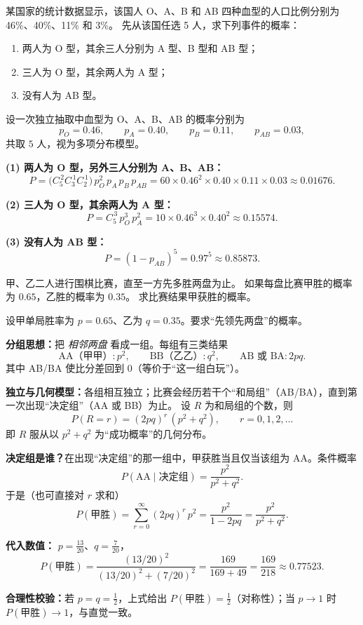 \begin{exercise}
某国家的统计数据显示，该国人 O、A、B 和 AB 四种血型的人口比例分别为 46\%、40\%、11\% 和 3\%。
先从该国任选 5 人，求下列事件的概率：
\begin{enumerate}
  \item 两人为 O 型，其余三人分别为 A 型、B 型和 AB 型；
  \item 三人为 O 型，其余两人为 A 型；
  \item 没有人为 AB 型。
\end{enumerate}
\end{exercise}
\begin{solution}
设一次独立抽取中血型为 O、A、B、AB 的概率分别为
\[
p_O=0.46,\qquad p_A=0.40,\qquad p_B=0.11,\qquad p_{AB}=0.03,
\]
共取 $5$ 人，视为多项分布模型。

\textbf{(1) 两人为 O 型，另外三人分别为 A、B、AB：}
\[
P=\bigl(C_{5}^{\,2} C_{3}^{\,1} C_{2}^{\,1}\bigr)\,p_O^{2}\,p_A\,p_B\,p_{AB}
=60\times 0.46^{2}\times 0.40\times 0.11\times 0.03
\approx 0.01676.
\]

\textbf{(2) 三人为 O 型，其余两人为 A 型：}
\[
P=C_{5}^{\,3}\,p_O^{3}\,p_A^{2}
=10\times 0.46^{3}\times 0.40^{2}
\approx 0.15574.
\]

\textbf{(3) 没有人为 AB 型：}
\[
P=(1-p_{AB})^{5}=0.97^{5}\approx 0.85873.
\]
\end{solution}
\begin{exercise}
甲、乙二人进行围棋比赛，直至一方先多胜两盘为止。
如果每盘比赛甲胜的概率为 $0.65$，乙胜的概率为 $0.35$。
求比赛结果甲获胜的概率。
\end{exercise}
\begin{solution}
设甲单局胜率为 $p=0.65$、乙为 $q=0.35$。要求“先领先两盘”的概率。

\textbf{分组思想：}把 \emph{相邻两盘} 看成一组。每组有三类结果  
\[
\text{AA（甲甲）}:p^2,\qquad
\text{BB（乙乙）}:q^2,\qquad
\text{AB 或 BA}:2pq.
\]
其中 AB/BA 使比分差回到 $0$（等价于“这一组白玩”）。

\textbf{独立与几何模型：}各组相互独立；比赛会经历若干个“和局组”（AB/BA），直到第一次出现“决定组”（AA 或 BB）为止。  
设 $R$ 为和局组的个数，则
\[
P(R=r)=(2pq)^r\,(p^2+q^2),\qquad r=0,1,2,\dots
\]
即 $R$ 服从以 $p^2+q^2$ 为“成功概率”的几何分布。

\textbf{决定组是谁？}在出现“决定组”的那一组中，甲获胜当且仅当该组为 AA。条件概率
\[
P(\text{AA}\mid \text{决定组})=\frac{p^2}{p^2+q^2}.
\]
于是（也可直接对 $r$ 求和）
\[
P(\text{甲胜})
=\sum_{r=0}^{\infty} (2pq)^r\,p^2
=\frac{p^2}{1-2pq}
=\frac{p^2}{p^2+q^2}.
\]

\textbf{代入数值：} $p=\tfrac{13}{20}$、$q=\tfrac{7}{20}$，
\[
P(\text{甲胜})=\frac{(13/20)^2}{(13/20)^2+(7/20)^2}
=\frac{169}{169+49}=\frac{169}{218}\approx 0.77523.
\]

\textbf{合理性校验：}若 $p=q=\tfrac12$，上式给出 $P(\text{甲胜})=\tfrac12$（对称性）；当 $p\to1$ 时 $P(\text{甲胜})\to1$，与直觉一致。
\end{solution}

